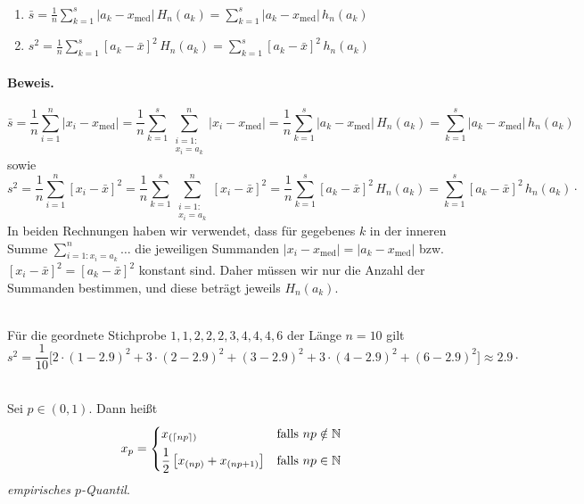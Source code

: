 \begin{satz}
     \\
    \begin{enumerate}[label=(\alph*)]
        \item $\displaystyle \bar s = \frac1n\sum_{k=1}^s |a_k-x_{\mathrm{med}}|\, H_n(a_k) = \sum_{k=1}^s |a_k-x_{\mathrm{med}}|\, h_n(a_k)$
        \item $\displaystyle s^2 = \frac1n\sum_{k=1}^s [a_k-\bar x]^2\, H_n(a_k) = \sum_{k=1}^s [a_k-\bar x]^2\, h_n(a_k)$
    \end{enumerate}

    \paragraph{Beweis.}   \[
                              \bar s = \frac1n\sum_{i=1}^n |x_i-x_{\mathrm{med}}| = \frac1n\sum_{k=1}^s \sum_{\substack{i=1:\\ x_i=a_k}}^n |x_i-x_{\mathrm{med}}| = \frac1n\sum_{k=1}^s |a_k-x_{\mathrm{med}}|\,H_n(a_k) = \sum_{k=1}^s |a_k-x_{\mathrm{med}}|\,h_n(a_k)
    \]
    sowie
    \[
        s^2 = \frac1n\sum_{i=1}^n [x_i-\bar x]^2 = \frac1n\sum_{k=1}^s \sum_{\substack{i=1:\\ x_i=a_k}}^n [x_i-\bar x]^2 = \frac1n\sum_{k=1}^s [a_k-\bar x]^2\,H_n(a_k) = \sum_{k=1}^s [a_k-\bar x]^2\,h_n(a_k) \cdot
    \]
    In beiden Rechnungen haben wir verwendet, dass für gegebenes $k$ in der inneren Summe $\sum_{i=1:x_i=a_k}^n \dots$ die jeweiligen Summanden $|x_i-x_{\mathrm{med}}|=|a_k-x_{\mathrm{med}}|$ bzw.\ $[x_i-\bar x]^2 = [a_k-\bar x]^2$ konstant sind.
    Daher müssen wir nur die Anzahl der Summanden bestimmen, und diese beträgt jeweils $H_n(a_k)$.
\end{satz}

\begin{bsp}
     \\
    Für die geordnete Stichprobe $1,1,2,2,2,3,4,4,4,6$ der Länge $n=10$ gilt
    \[
        s^2 = \frac{1}{10}\Big[2\cdot(1-2.9)^2 + 3\cdot(2-2.9)^2 + (3-2.9)^2 + 3\cdot(4-2.9)^2 + (6-2.9)^2\Big] \approx 2.9 \cdot
    \]
\end{bsp}

\begin{defi}
     \\
    Sei $p\in(0,1)$.
    Dann heißt
    \[
        x_p =
        \begin{cases}
            x_{(\lceil np\rceil)} & \text{falls } np\notin\mathbb{N} \\[1ex]
            \dfrac12\left[x_{(np)}+x_{(np+1)}\right] & \text{falls } np\in\mathbb{N}
        \end{cases}
    \]
    \emph{empirisches $p$-Quantil}.
\end{defi}

